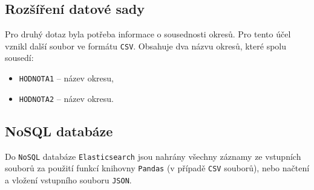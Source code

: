 \documentclass[11pt,a4paper,titlepage]{article}
\begin{document}







\subsection{Rozšíření datové sady}
Pro druhý dotaz byla potřeba informace o sousednosti okresů. Pro tento účel vznikl další soubor ve formátu \texttt{CSV}. Obsahuje dva názvu okresů, které spolu sousedí:
\begin{itemize}
    \setlength\itemsep{0.3em}
    \item \texttt{HODNOTA1} -- název okresu,
    \item \texttt{HODNOTA2} -- název okresu.
\end{itemize}

\subsection{NoSQL databáze}
Do \texttt{NoSQL} databáze \texttt{Elasticsearch} jsou nahrány všechny záznamy ze vstupních souborů za použití funkcí knihovny \texttt{Pandas} (v případě \texttt{CSV} souborů), nebo načtení a vložení vstupního souboru \texttt{JSON}. 
\end{document}

